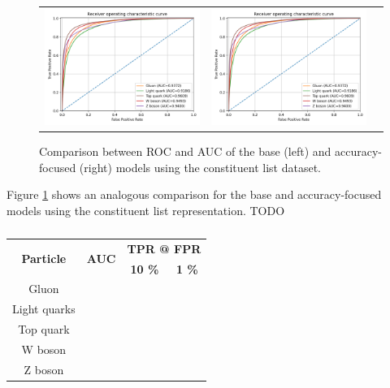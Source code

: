 \begin{figure}[!hpt]
  \centering
  \begin{tabular}{ccc}
      {\includegraphics[width=0.48\columnwidth]{../logs/ROC.png}} &
      {\includegraphics[width=0.48\columnwidth]{../logs/ROC.png}}
  \end{tabular}
  \caption{Comparison between ROC and AUC of the base (left) and accuracy-focused (right) models using the constituent list dataset.}
  \label{fig:ROCs-constituent}
\end{figure}

Figure \ref{fig:ROCs-constituent} shows an analogous comparison for the base and accuracy-focused models using the constituent list representation. TODO

\begin{table}[]
  \centering
  \caption{}
  \label{tab:AUCs}
  \begin{tabular}{|c|c|cc|}
  \hline
  \multirow{2}{*}{\textbf{Particle}} & \multirow{2}{*}{\textbf{AUC}} & \multicolumn{2}{c|}{\textbf{TPR @ FPR}} \\ \cline{3-4} 
   &  & \multicolumn{1}{c|}{\textbf{10 \%}} & \textbf{1 \%} \\ \hline
  Gluon &  & \multicolumn{1}{c|}{} &  \\ \hline
  Light quarks &  & \multicolumn{1}{c|}{} &  \\ \hline
  Top quark &  & \multicolumn{1}{c|}{} &  \\ \hline
  W boson &  & \multicolumn{1}{c|}{} &  \\ \hline
  Z boson &  & \multicolumn{1}{c|}{} &  \\ \hline
  \end{tabular}
\end{table}


